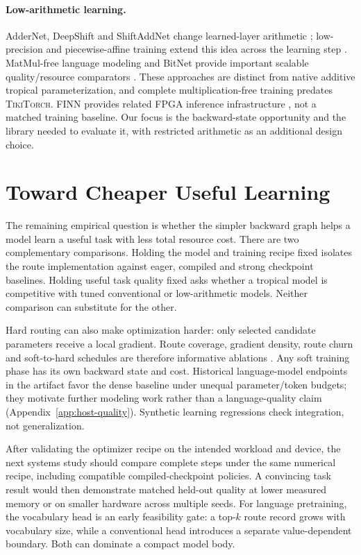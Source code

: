 \documentclass{article}
\theoremstyle{plain}
\theoremstyle{definition}
\theoremstyle{remark}
\newcommand{\ttorch}{\textsc{TikiTorch}}
\begin{document}
\paragraph{Low-arithmetic learning.}
AdderNet, DeepShift and ShiftAddNet change learned-layer arithmetic
\citep{addernet,deepShift,shiftaddnet}; low-precision and piecewise-affine
training extend this idea across the learning step
\citep{liu2023multfree,kosson2023multiplicationfree}. MatMul-free language
modeling and BitNet provide important scalable quality/resource comparators
\citep{zhu2024matmulfree,ma2024bitnet,ma2025bitnet}. These approaches are
distinct from native additive tropical parameterization, and complete
multiplication-free training predates \ttorch{}. FINN provides related
FPGA inference infrastructure \citep{umuroglu2017finn}, not a matched
training baseline. Our focus is the backward-state opportunity and the
library needed to evaluate it, with restricted arithmetic as an additional
design choice.

\section{Toward Cheaper Useful Learning}

The remaining empirical question is whether the simpler backward graph
helps a model learn a useful task with less total resource cost. There are
two complementary comparisons. Holding the model and training recipe
fixed isolates the route implementation against eager, compiled and
strong checkpoint baselines. Holding useful task quality fixed asks
whether a tropical model is competitive with tuned conventional or
low-arithmetic models. Neither comparison can substitute for the other.

Hard routing can also make optimization harder: only selected candidate
parameters receive a local gradient. Route coverage, gradient density,
route churn and soft-to-hard schedules are therefore informative
ablations \citep{fotopoulos2025training}. Any soft training phase has its
own backward state and cost. Historical language-model endpoints in the
artifact favor the dense baseline under unequal parameter/token budgets;
they motivate further modeling work rather than a language-quality claim
(Appendix~\ref{app:host-quality}). Synthetic learning regressions check
integration, not generalization.

After validating the optimizer recipe on the intended workload and device,
the next systems study should
compare complete steps under the same numerical recipe, including
compatible compiled-checkpoint policies. A convincing task result would
then demonstrate matched held-out quality at lower measured memory or on
smaller hardware across multiple seeds. For language pretraining, the
vocabulary head is an early feasibility gate: a top-$k$ route record grows
with vocabulary size, while a conventional head introduces a separate
value-dependent boundary. Both can dominate a compact model body.
\end{document}

